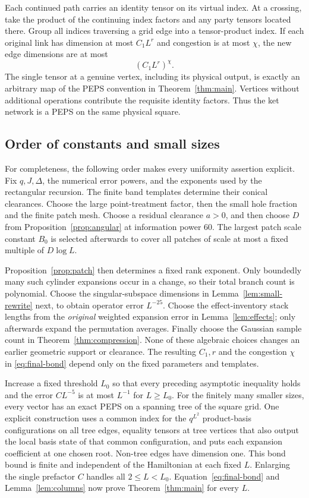 \documentclass[11pt]{article}
\numberwithin{equation}{section}
\theoremstyle{definition}
\theoremstyle{remark}
\begin{document}
Each continued path carries an identity tensor on its virtual index.
At a crossing, take the product of the continuing index factors and any
party tensors located there. Group all indices traversing a grid edge
into a tensor-product index. If each original link has dimension at most
$C_1L^r$ and congestion is at most $\chi$, the new edge dimensions are at
most
\begin{equation}\label{eq:final-bond}
 (C_1L^r)^\chi.
\end{equation}
The single tensor at a genuine vertex, including its physical output,
is exactly an arbitrary map of the PEPS convention in
Theorem~\ref{thm:main}. Vertices without additional operations contribute
the requisite identity factors. Thus the ket network is a PEPS on the
same physical square.

\subsection{Order of constants and small sizes}

For completeness, the following order makes every uniformity assertion
explicit. Fix $q,J,\Delta$, the numerical error powers, and the exponents
used by the rectangular recursion. The finite band templates determine
their conical clearances. Choose the large point-treatment factor, then
the small hole fraction and the finite patch mesh. Choose a residual
clearance $a>0$, and then choose $D$ from
Proposition~\ref{prop:angular} at information power $60$.
The largest patch scale constant $B_0$ is selected afterwards to cover
all patches of scale at most a fixed multiple of $D\log L$.

Proposition~\ref{prop:patch} then determines a fixed rank exponent.
Only boundedly many such cylinder expansions occur in a change, so their
total branch count is polynomial. Choose the singular-subspace dimensions
in Lemma~\ref{lem:small-rewrite} next, to obtain operator error
$L^{-25}$. Choose the effect-inventory stack lengths from the
\emph{original} weighted expansion error in Lemma~\ref{lem:effects};
only afterwards expand the permutation averages. Finally choose the
Gaussian sample count in Theorem~\ref{thm:compression}. None of these
algebraic choices changes an earlier geometric support or clearance.
The resulting $C_1,r$ and the congestion $\chi$ in
\eqref{eq:final-bond} depend only on the fixed parameters and templates.

Increase a fixed threshold $L_0$ so that every preceding asymptotic
inequality holds and the error $CL^{-5}$ is at most $L^{-1}$ for
$L\ge L_0$. For the finitely many smaller sizes, every vector has an exact
PEPS on a spanning tree of the square grid. One explicit construction
uses a common index for the $q^{L^2}$ product-basis configurations on all
tree edges, equality tensors at tree vertices that also output the local basis state
of that common configuration, and puts each expansion coefficient at one
chosen root. Non-tree edges have dimension one.
This bond bound is finite and independent of the Hamiltonian at each
fixed $L$. Enlarging the single prefactor $C$ handles all $2\le L<L_0$.
Equation~\eqref{eq:final-bond} and Lemma~\ref{lem:columns} now prove
Theorem~\ref{thm:main} for every $L$.
\end{document}

